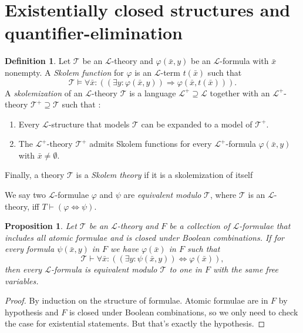 \documentclass{report}
\theoremstyle{definition}
\theoremstyle{plain}
\newtheorem{prop}[thm]{Proposition}
\theoremstyle{definition}
\newtheorem{defn}[thm]{Definition}
\begin{document}
 		\section{Existentially closed structures and quantifier-elimination}
 		\begin{defn}
 			Let $\mathcal{T}$ be an $\mathcal{L}$-theory and $\varphi(\bar{x},y)$ be an $\mathcal{L}$-formula with $\bar{x}$ nonempty. A \emph{Skolem function} for $\varphi$ is an $\mathcal{L}$-term $t(\bar{x})$ such that
 			\[
 				\mathcal{T} \models \forall \bar{x}:((\exists y: \varphi(\bar{x}, y)) \Rightarrow \varphi(\bar{x},t(\bar{x}))).
 			\]
 			A \emph{skolemization} of an $\mathcal{L}$-theory $\mathcal{T}$ is a language $\mathcal{L}^+\supseteq \mathcal{L}$ together with an $\mathcal{L}^+$-theory $\mathcal{T}^+\supseteq \mathcal{T}$ such that :
 			\begin{enumerate}[label=(\arabic*)]
 				\item Every $\mathcal{L}$-structure that models $\mathcal{T}$ can be expanded to a model of $\mathcal{T}^+$.
 				\item The $\mathcal{L}^+$-theory $\mathcal{T}^+$ admits Skolem functions for every $\mathcal{L}^+$-formula $\varphi(\bar{x},y)$ with $\bar{x}\neq \emptyset$.
 			\end{enumerate}
 			Finally, a theory $\mathcal{T}$ is a \emph{Skolem theory} if it is a skolemization of itself
 		\end{defn}
 		We say two $\mathcal{L}$-formulae $\varphi$ and $\psi$ are \emph{equivalent modulo} $\mathcal{T}$, where $\mathcal{T}$ is an $\mathcal{L}$-theory, iff $T \vdash (\varphi \iff \psi)$.
 		\begin{prop}\label{prop:fam_eq_mod}
 			Let $\mathcal{T}$ be an $\mathcal{L}$-theory and $F$ be a collection of $\mathcal{L}$-formulae that includes all atomic formulae and is closed under Boolean combinations. If for every formula $\psi(\bar{x},y)$ in $F$ we have $\varphi(\bar{x})$ in $F$ such that 
 			\[
 				\mathcal{T} \vdash \forall \bar{x}: ((\exists y: \psi(\bar{x}, y))\iff \varphi(\bar{x})),
 			\]
 			then every $\mathcal{L}$-formula is equivalent modulo $\mathcal{T}$ to one in $F$ with the same free variables.
 		\end{prop}
 		\begin{proof}
 			By induction on the structure of formulae. Atomic formulae are in $F$ by hypothesis and $F$ is closed under Boolean combinations, so we only need to check the case for existential statements. But that's exactly the hypothesis.
 		\end{proof}
\end{document}
